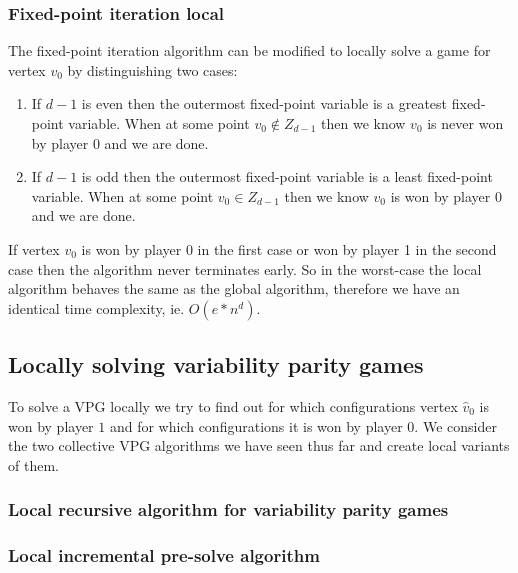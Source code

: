 \subsubsection{Fixed-point iteration local}
The fixed-point iteration algorithm can be modified to locally solve a game for vertex $v_0$ by distinguishing two cases:
\begin{enumerate}
	\item If $d-1$ is even then the outermost fixed-point variable is a greatest fixed-point variable. When at some point $v_0 \notin Z_{d-1}$ then we know $v_0$ is never won by player $0$ and we are done.
	\item If $d-1$ is odd then the outermost fixed-point variable is a least fixed-point variable. When at some point $v_0 \in Z_{d-1}$ then we know $v_0$ is won by player $0$ and we are done.
\end{enumerate}

If vertex $v_0$ is won by player 0 in the first case or won by player 1 in the second case then the algorithm never terminates early. So in the worst-case the local algorithm behaves the same as the global algorithm, therefore we have an identical time complexity, ie. $O(e*n^d)$.

\subsection{Locally solving variability parity games}
To solve a VPG locally we try to find out for which configurations vertex $\hat{v}_0$ is won by player $1$ and for which configurations it is won by player $0$. We consider the two collective VPG algorithms we have seen thus far and create local variants of them.
\subsubsection{Local recursive algorithm for variability parity games}


\subsubsection{Local incremental pre-solve algorithm}
